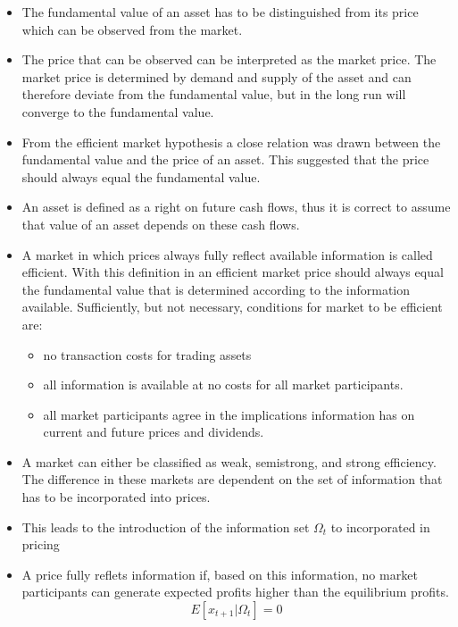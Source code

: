     \begin{itemize}
        \item  The fundamental value of an asset has to be distinguished from its price which can be observed from the market.
        \item  The price that can be observed can be interpreted as the market price. The market price is determined by demand and supply of the asset and can therefore deviate from the fundamental value, but in the long run will converge to the fundamental value. 
        \item From the efficient market hypothesis a close relation was drawn between the fundamental value and the price of an asset. This suggested that the price should always equal the fundamental value. 
        \item An asset is defined as a right on future cash flows, thus it is correct to assume that value of an asset depends on these cash flows.  
        \item A market in which prices always fully reflect available information is called efficient. With this definition in an efficient market price should always equal the fundamental value that is determined according to the information available. Sufficiently, but not necessary, conditions for market to be efficient are: 
            \begin{itemize}
                \item no transaction costs for trading assets
                \item all information is available at no costs for all market participants. 
                \item all market participants agree in the implications information has on current and future prices and dividends.
            \end{itemize}
        \item A market can either be classified as weak, semistrong, and strong efficiency. The difference in these markets are dependent on the set of information that has to be incorporated into prices. 
        \item This leads to the introduction of the information set $\Omega_t$ to incorporated in pricing
        \item A price fully reflets information if, based on this information, no market participants can generate expected profits higher than the equilibrium profits. 
        \begin{equation}
            E[x_{t+1} | \Omega_t] = 0
        \end{equation}

\end{itemize}
